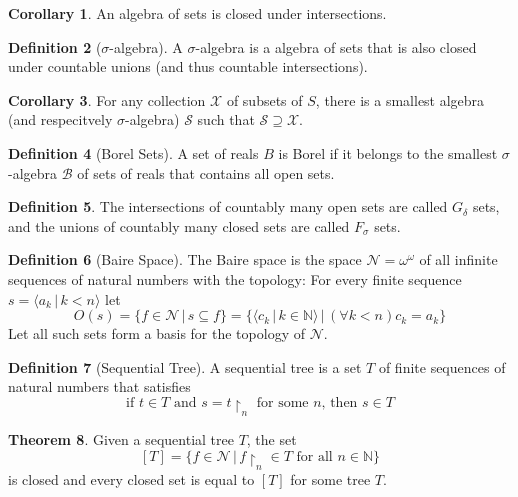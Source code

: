 \documentclass{article}
\theoremstyle{definition}
\newtheorem{thm}{Theorem}[section]
\newtheorem{crly}[thm]{Corollary}
\newtheorem{defn}[thm]{Definition}
\newcommand{\N}{\mathbb{N}}
\begin{document}
\begin{crly}
    An algebra of sets is closed under intersections.
\end{crly}

\begin{defn}[$\sigma$-algebra]
    A $\sigma$-algebra is a algebra of sets that is also closed under countable unions (and thus countable intersections).
\end{defn}

\begin{crly}
    For any collection $\mathcal{X}$ of subsets of $S$, there is a smallest algebra (and respecitvely $\sigma$-algebra) $\mathcal{S}$ such that $\mathcal{S} \supseteq \mathcal{X}$.
\end{crly}

\begin{defn}[Borel Sets]
    A set of reals $B$ is Borel if it belongs to the smallest $\sigma$-algebra $\mathcal{B}$ of sets of reals that contains all open sets.
\end{defn}

\begin{defn}
    The intersections of countably many open sets are called $G_\delta$ sets, and the unions of countably many closed sets are called $F_\sigma$ sets.
\end{defn}

\begin{defn}[Baire Space]
    The Baire space is the space $\mathcal{N} = \omega^\omega$ of all infinite sequences of natural numbers with the topology: For every finite sequence $s = \langle a_k \, | \, k < n \rangle$ let 
    \[
        O(s) = \{f \in \mathcal{N} \, | \, s \subseteq f \} = \{\langle c_k \, | \, k \in \N \rangle \, | \, (\forall k < n) c_k = a_k\}
    \]
    Let all such sets form a basis for the topology of $\mathcal{N}$.
\end{defn}

\begin{defn}[Sequential Tree]
    A sequential tree is a set $T$ of finite sequences of natural numbers that satisfies 
    \[
        \text{if } t \in T \text{ and } s = t\restriction_n \text{ for some $n$, then } s \in T    
    \]
\end{defn}

\begin{thm}
    Given a sequential tree $T$, the set
    \[
        [T] = \{f \in \mathcal{N} \, | \, f\restriction_{n} \in T \text{ for all } n \in \N\}    
    \]
    is closed and every closed set is equal to $[T]$ for some tree $T$.
\end{thm}
\end{document}
